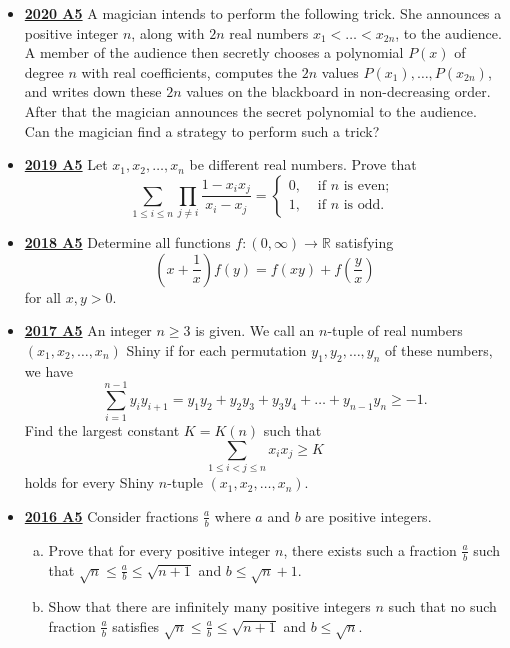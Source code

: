 \documentclass[11pt]{scrartcl}
\begin{document}
\begin{itemize}[leftmargin=*]
\item \href{https://artofproblemsolving.com/community/c6h2625872p22698165}{\textbf{2020 A5}} 	A magician intends to perform the following trick. She announces a positive integer $n$, along with $2n$ real numbers $x_1 < \dots < x_{2n}$, to the audience. A member of the audience then secretly chooses a polynomial $P(x)$ of degree $n$ with real coefficients, computes the $2n$ values $P(x_1), \dots , P(x_{2n})$, and writes down these $2n$ values on the blackboard in non-decreasing order. After that the magician announces the secret polynomial to the audience. Can the magician find a strategy to perform such a trick?
\item \href{https://artofproblemsolving.com/community/c6h2279006p17828803}{\textbf{2019 A5}} Let $x_1, x_2, \dots, x_n$ be different real numbers. Prove that
\[\sum_{1 \leqslant i \leqslant n} \prod_{j \neq i} \frac{1-x_{i} x_{j}}{x_{i}-x_{j}}=\left\{\begin{array}{ll}
0, & \text { if } n \text { is even; } \\
1, & \text { if } n \text { is odd. }
\end{array}\right.\]
\item \href{https://artofproblemsolving.com/community/c6h1876752p12752798}{\textbf{2018 A5}} Determine all functions $f:(0,\infty)\to\mathbb{R}$ satisfying$$\left(x+\frac{1}{x}\right)f(y)=f(xy)+f\left(\frac{y}{x}\right)$$for all $x,y>0$.
\newpage
\item \href{https://artofproblemsolving.com/community/c6h1671280p10632315}{\textbf{2017 A5}} An integer $n \geqslant  3$ is given. We call an $n$-tuple of real numbers $(x_1, x_2, \dots, x_n)$ Shiny if for each permutation $y_1, y_2, \dots, y_n$ of these numbers, we have
$$\sum \limits_{i=1}^{n-1} y_i y_{i+1} = y_1y_2 + y_2y_3 + y_3y_4 + \dots + y_{n-1}y_n \geqslant  -1.$$Find the largest constant $K = K(n)$ such that
$$\sum \limits_{1 \leqslant i < j \leqslant n} x_i x_j \geqslant  K$$holds for every Shiny $n$-tuple $(x_1, x_2, \dots, x_n)$.
\item \href{https://artofproblemsolving.com/community/c6h1480728p8639342}{\textbf{2016 A5}} 	Consider fractions $\frac{a}{b}$ where $a$ and $b$ are positive integers. 
\begin{enumerate}[(a)]
    \item Prove that for every positive integer $n$, there exists such a fraction $\frac{a}{b}$ such that $\sqrt{n} \leqslant \frac{a}{b} \leqslant \sqrt{n+1}$ and $b \leqslant \sqrt{n}+1$. 
    \item Show that there are infinitely many positive integers $n$ such that no such fraction $\frac{a}{b}$ satisfies $\sqrt{n} \leqslant \frac{a}{b} \leqslant \sqrt{n+1}$ and $b \leqslant \sqrt{n}$.

\end{enumerate}
\end{itemize}
\end{document}
